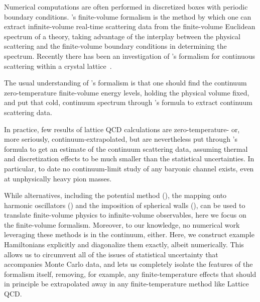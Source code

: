 Numerical computations are often performed in discretized boxes with periodic boundary conditions.
\Luscher's finite-volume formalism\cite{Hamber198399,luscher:1986I,luscher:1986II,wiese1989,Luscher1991,Luscher1991237} is the method by which one can extract infinite-volume real-time scattering data from the finite-volume Euclidean spectrum of a theory, taking advantage of the interplay between the physical scattering and the finite-volume boundary conditions in determining the spectrum.  Recently there has been an investigation of \Luscher's formalism for continuous scattering within a crystal lattice~\cite{Valiente:2015oya}.

The usual understanding of \Luscher's formalism is that one should find the continuum zero-temperature finite-volume energy levels, holding the physical volume fixed, and put that cold, continuum spectrum through \Luscher's formula to extract continuum scattering data.

In practice, few results of lattice QCD calculations are zero-temperature- or, more seriously, continuum-extrapolated, but are nevertheless put through \Luscher's formula to get an estimate of the continuum scattering data, assuming thermal and discretization effects to be much smaller than the statistical uncertainties.
In particular, to date no continuum-limit study of any baryonic channel exists, even at unphysically heavy pion masses.

While alternatives, including the potential method (), the mapping onto harmonic oscillators () and the imposition of spherical walls (), can be used to translate finite-volume physics to infinite-volume observables, here we focus on the \Luscher finite-volume formalism.
Moreover, to our knowledge, no numerical work leveraging these methods is in the continuum, either.
Here, we construct example Hamiltonians explicitly and diagonalize them exactly, albeit numerically.
This allows us to circumvent all of the issues of statistical uncertainty that accompanies Monte Carlo data, and lets us completely isolate the features of the formalism itself, removing, for example, any finite-temperature effects that should in principle be extrapolated away in any finite-temperature method like Lattice QCD.

